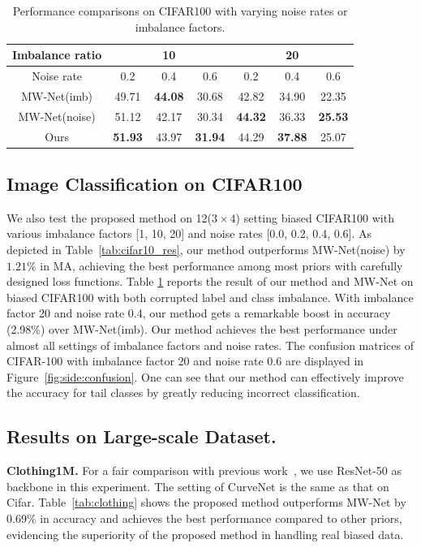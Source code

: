 \documentclass[letterpaper]{article} %
\newcommand{\bd}[1]{\textbf{#1}}
\begin{document}
\begin{table}[t]
\begin{center}
\begin{adjustbox}{max width=0.47\textwidth}
\begin{tabular}{c|c|c|c|c|c|c}
\hline
Imbalance ratio &  \multicolumn{3}{c|}{10}    & \multicolumn{3}{c}{20} \\
\hline
Noise rate & 0.2   & 0.4   & \multicolumn{1}{c|}{0.6} & 0.2   & 0.4   & \multicolumn{1}{c}{0.6} \\
\hline
MW-Net(imb) & 49.71  & \textbf{44.08 } & 30.68  & 42.82  & 34.90  & 22.35  \\
\hline
MW-Net(noise) & 51.12  & 42.17  & 30.34  & \textbf{44.32}  & 36.33  & \textbf{25.53 } \\
\hline
Ours  & \textbf{51.93 } & 43.97  & \textbf{31.94 } & 44.29  & \textbf{37.88 } & 25.07  \\
\hline
\end{tabular}%
\end{adjustbox}
\caption{Performance comparisons on CIFAR100 with varying noise rates or imbalance factors.
}
\label{tab:cifar100_res_d}
\end{center}
\end{table}

\subsection{Image Classification on CIFAR100}
We also test the proposed method on 12($3 \times 4$) setting biased CIFAR100 with various imbalance factors [1, 10, 20] and noise rates [0.0, 0.2, 0.4, 0.6].
As depicted in Table~\ref{tab:cifar10_res}, our method outperforms MW-Net(noise) by $1.21\%$ in MA, achieving the best performance among most priors with carefully designed loss functions.
Table \ref{tab:cifar100_res_d} reports the result of our method and MW-Net on biased CIFAR100 with both corrupted label and class imbalance.
With imbalance factor 20 and noise rate 0.4, our method gets a remarkable boost in accuracy (2.98\%) over MW-Net(imb).
Our method achieves the best performance under almost all settings of imbalance factors and noise rates.
The confusion matrices of CIFAR-100 with imbalance factor 20 and noise rate 0.6 are displayed in Figure~\ref{fig:side:confusion}.
One can see that our method can effectively improve the accuracy for tail classes by greatly reducing incorrect classification.

\subsection{Results on Large-scale Dataset.}
\noindent\bd{Clothing1M.}
For a fair comparison with previous work~\cite{shu2019meta}, we use ResNet-50 as backbone in this experiment.
The setting of CurveNet is the same as that on Cifar.
Table~\ref{tab:clothing} shows the proposed method outperforms MW-Net by 0.69\% in accuracy and achieves the best performance compared to other priors, evidencing the superiority of the proposed method in handling real biased data.
\end{document}
